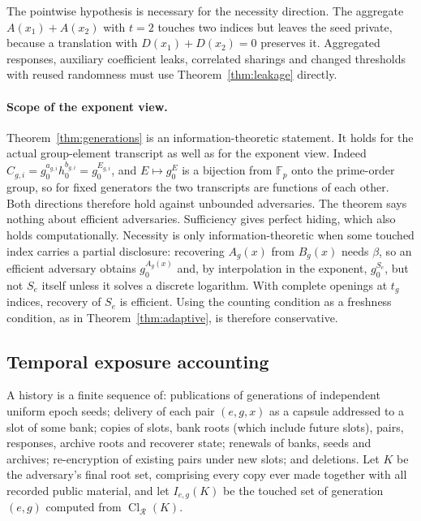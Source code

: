 \documentclass[pdflatex,sn-mathphys-num]{sn-jnl}
\theoremstyle{plain}
\theoremstyle{definition}
\newcommand{\Cl}{\operatorname{Cl}}
\newcommand{\F}{\mathbb{F}}
\begin{document}
The pointwise hypothesis is necessary for the necessity direction. The aggregate $A(x_1)+A(x_2)$ with $t=2$ touches two indices but leaves the seed private, because a translation with $D(x_1)+D(x_2)=0$ preserves it. Aggregated responses, auxiliary coefficient leaks, correlated sharings and changed thresholds with reused randomness must use Theorem~\ref{thm:leakage} directly.

\paragraph{Scope of the exponent view.}
Theorem~\ref{thm:generations} is an information-theoretic statement. It holds for the actual group-element transcript as well as for the exponent view. Indeed $C_{g,i}=g_0^{a_{g,i}}h_0^{b_{g,i}}=g_0^{E_{g,i}}$, and $E\mapsto g_0^E$ is a bijection from $\F_p$ onto the prime-order group, so for fixed generators the two transcripts are functions of each other. Both directions therefore hold against unbounded adversaries. The theorem says nothing about efficient adversaries. Sufficiency gives perfect hiding, which also holds computationally. Necessity is only information-theoretic when some touched index carries a partial disclosure: recovering $A_g(x)$ from $B_g(x)$ needs $\beta$, so an efficient adversary obtains $g_0^{A_g(x)}$ and, by interpolation in the exponent, $g_0^{S_e}$, but not $S_e$ itself unless it solves a discrete logarithm. With complete openings at $t_g$ indices, recovery of $S_e$ is efficient. Using the counting condition as a freshness condition, as in Theorem~\ref{thm:adaptive}, is therefore conservative.

\subsection{Temporal exposure accounting}
A history is a finite sequence of: publications of generations of independent uniform epoch seeds; delivery of each pair $(e,g,x)$ as a capsule addressed to a slot of some bank; copies of slots, bank roots (which include future slots), pairs, responses, archive roots and recoverer state; renewals of banks, seeds and archives; re-encryption of existing pairs under new slots; and deletions. Let $K$ be the adversary's final root set, comprising every copy ever made together with all recorded public material, and let $I_{e,g}(K)$ be the touched set of generation $(e,g)$ computed from $\Cl_{\mathcal R}(K)$.
\end{document}
